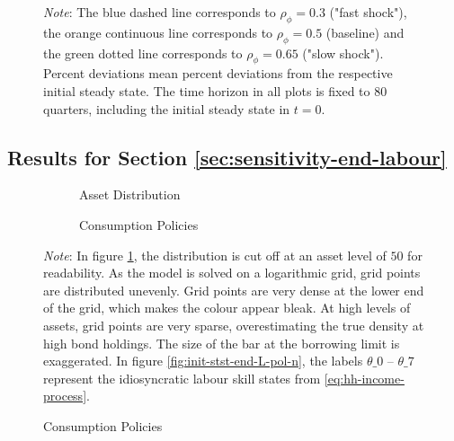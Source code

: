 \documentclass[a4paper,12pt]{article} %
\numberwithin{equation}{section} %
\numberwithin{figure}{section}
\numberwithin{table}{section}
\begin{document}
\begin{refsection}
\begin{appendices}
\begin{figure}[H]
     \vspace{10pt}

     \begin{minipage}{\textwidth} 
    \footnotesize
    \textit{Note}: The blue dashed line corresponds to $\rho_{\phi} = 0.3$ ("fast shock"), the orange continuous line corresponds to $\rho_{\phi} = 0.5$ (baseline) and the green dotted line corresponds to $\rho_{\phi} = 0.65$ ("slow shock"). Percent deviations mean percent deviations from the respective initial steady state. The time horizon in all plots is fixed to $80$ quarters, including the initial steady state in $t=0$.
    \end{minipage}
\end{figure}

\subsection{Results for Section \ref{sec:sensitivity-end-labour}}
\label{sec-app:figures-end-L}

\begin{figure}[H]
    \caption{Endogenous Labour -- The Initial Steady State}
    \label{fig:init-stst-end-L}
    \centering
    \begin{subfigure}[b]{0.49\textwidth}
    \caption{Asset Distribution}
    \label{fig:init-stst-end-L-dist}
         \centering
         
     \end{subfigure}
     \hfill
     \begin{subfigure}[b]{0.49\textwidth}
     \caption{Consumption Policies}
     \label{fig:init-stst-end-L-pol-c}
         \centering
         
     \end{subfigure}

    \vspace{10pt}
     
     \justifying
     \footnotesize
	\textit{Note}: In figure \ref{fig:init-stst-end-L-dist}, the distribution is cut off at an asset level of $50$ for readability. As the model is solved on a logarithmic grid, grid points are distributed unevenly. Grid points are very dense at the lower end of the grid, which makes the colour appear bleak. At high levels of assets, grid points are very sparse, overestimating the true density at high bond holdings. The size of the bar at the borrowing limit is exaggerated. In figure \ref{fig:init-stst-end-L-pol-n}, the labels $\theta\_0$ -- $\theta\_7$ represent the idiosyncratic labour skill states from \eqref{eq:hh-income-process}.
\end{figure}


\end{appendices}
\end{refsection}
\end{document}
